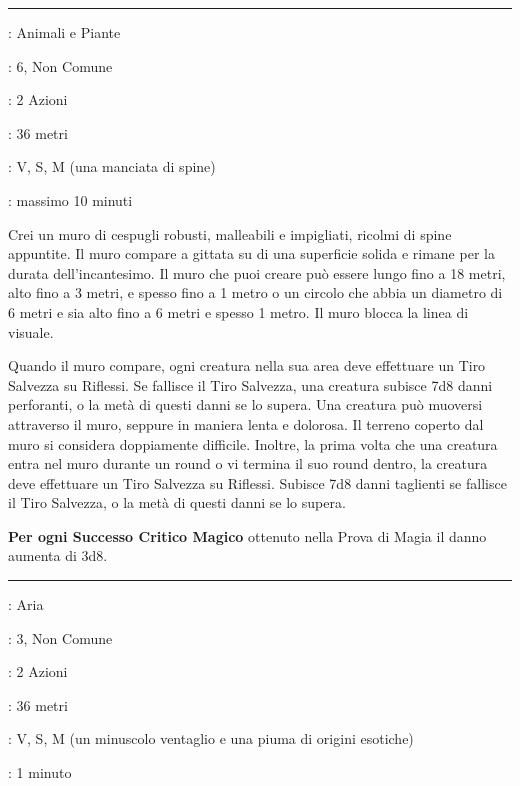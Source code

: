 \begin{multicols}{2}
\begin{itemize}[leftmargin=*]
\end{itemize}

\smallskip\noindent\rule{\linewidth}{2pt} \hypertarget{Muro di Spine}{}\medskip{}
\noindent
\begin{description}[noitemsep, topsep=0pt, parsep=0pt, partopsep=0pt, leftmargin=0cm, labelwidth=2.8cm]
	\item[\textbf{Lista di Magia}]: Animali e Piante
	\item[\textbf{Livello}]: 6, Non Comune
	\item[\textbf{T. di Lancio}]: 2 Azioni
	\item[\textbf{Gittata}]: 36 metri
	\item[\textbf{Componenti}]: V, S, M (una manciata di spine)
	\item[\textbf{Durata}]: massimo 10 minuti
\end{description}

Crei un muro di cespugli robusti, malleabili e impigliati, ricolmi di spine appuntite. Il muro compare a gittata su di una superficie solida e rimane per la durata dell'incantesimo. Il muro che puoi creare può essere lungo fino a 18 metri, alto fino a 3 metri, e spesso fino a 1 metro o un circolo che abbia un diametro di 6 metri e sia alto fino a 6 metri e spesso 1 metro. Il muro blocca la linea di visuale.

Quando il muro compare, ogni creatura nella sua area deve effettuare un Tiro Salvezza su Riflessi. Se fallisce il Tiro Salvezza, una creatura subisce 7d8 danni perforanti, o la metà di questi danni se lo supera. Una creatura può muoversi attraverso il muro, seppure in maniera lenta e dolorosa. Il terreno coperto dal muro si considera doppiamente difficile. Inoltre, la prima volta che una creatura entra nel muro durante un round o vi termina il suo round dentro, la creatura deve effettuare un Tiro Salvezza su Riflessi. Subisce 7d8 danni taglienti se fallisce il Tiro Salvezza, o la metà di questi danni se lo supera.

\textbf{Per ogni Successo Critico Magico} ottenuto nella Prova di Magia il danno aumenta di 3d8.

\smallskip\noindent\rule{\linewidth}{2pt} \hypertarget{Muro di Vento}{}\medskip{}
\noindent
\begin{description}[noitemsep, topsep=0pt, parsep=0pt, partopsep=0pt, leftmargin=0cm, labelwidth=2.8cm]
	\item[\textbf{Lista di Magia}]: Aria
	\item[\textbf{Livello}]: 3, Non Comune
	\item[\textbf{T. di Lancio}]: 2 Azioni
	\item[\textbf{Gittata}]: 36 metri
	\item[\textbf{Componenti}]: V, S, M (un minuscolo ventaglio e una piuma di origini esotiche)
	\item[\textbf{Durata}]: 1 minuto
\end{description}


\end{multicols}
